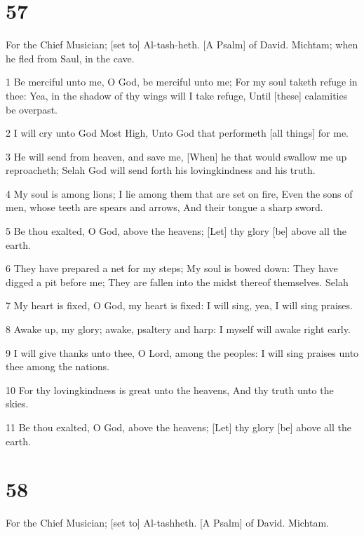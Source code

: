 \chapter{57}

\par For the Chief Musician; [set to] Al-tash-heth. [A Psalm] of David. Michtam; when he fled from Saul, in the cave.

\par 1 Be merciful unto me, O God, be merciful unto me; For my soul taketh refuge in thee: Yea, in the shadow of thy wings will I take refuge, Until [these] calamities be overpast.
\par 2 I will cry unto God Most High, Unto God that performeth [all things] for me.
\par 3 He will send from heaven, and save me, [When] he that would swallow me up reproacheth; Selah God will send forth his lovingkindness and his truth.
\par 4 My soul is among lions; I lie among them that are set on fire, Even the sons of men, whose teeth are spears and arrows, And their tongue a sharp sword.
\par 5 Be thou exalted, O God, above the heavens; [Let] thy glory [be] above all the earth.
\par 6 They have prepared a net for my steps; My soul is bowed down: They have digged a pit before me; They are fallen into the midst thereof themselves. Selah
\par 7 My heart is fixed, O God, my heart is fixed: I will sing, yea, I will sing praises.
\par 8 Awake up, my glory; awake, psaltery and harp: I myself will awake right early.
\par 9 I will give thanks unto thee, O Lord, among the peoples: I will sing praises unto thee among the nations.
\par 10 For thy lovingkindness is great unto the heavens, And thy truth unto the skies.
\par 11 Be thou exalted, O God, above the heavens; [Let] thy glory [be] above all the earth.

\chapter{58}

\par For the Chief Musician; [set to] Al-tashheth. [A Psalm] of David. Michtam.


